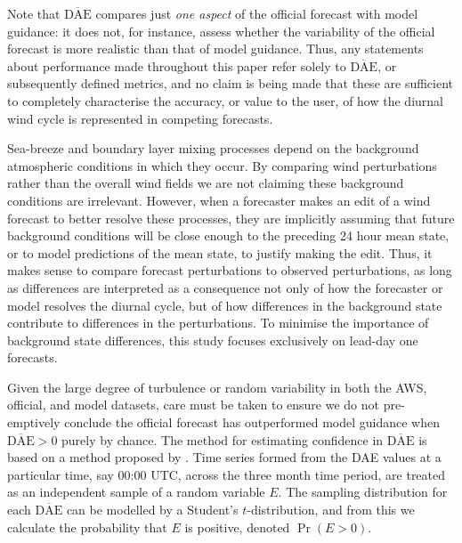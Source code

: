 \documentclass[twocol]{ametsoc}
\DeclareMathOperator{\pr}{Pr}
\begin{document}
Note that $\overline{\text{DAE}}$ compares just \textit{one aspect} of the official forecast with model guidance: it does not, for instance, assess whether the variability of the official forecast is more realistic than that of model guidance. Thus, any statements about performance made throughout this paper refer solely to $\overline{\text{DAE}}$, or subsequently defined metrics, and no claim is being made that these are sufficient to completely characterise the accuracy, or value to the user, of how the diurnal wind cycle is represented in competing forecasts.

Sea-breeze and boundary layer mixing processes depend on the background atmospheric conditions in which they occur. By comparing wind perturbations rather than the overall wind fields we are not claiming these background conditions are irrelevant. However, when a forecaster makes an edit of a wind forecast to better resolve these processes, they are implicitly assuming that future background conditions will be close enough to the preceding 24 hour mean state, or to model predictions of the mean state, to justify making the edit. Thus, it makes sense to compare forecast perturbations to observed perturbations, as long as differences are interpreted as a consequence not only of how the forecaster or model resolves the diurnal cycle, but of how differences in the background state contribute to differences in the perturbations. To minimise the importance of background state differences, this study focuses exclusively on lead-day one forecasts.

Given the large degree of turbulence or random variability in both the AWS, official, and model datasets, care must be taken to ensure we do not pre-emptively conclude the official forecast has outperformed model guidance when $\overline{\text{DAE}}>0$ purely by chance. The method for estimating confidence in $\overline{\text{DAE}}$ is based on a method proposed by \citet{griffiths17}. Time series formed from the DAE values at a particular time, say 00:00 UTC, across the three month time period, are treated as an independent sample of a random variable $E$. The sampling distribution for each $\overline{\text{DAE}}$ can be modelled by a Student's $t$-distribution, and from this we calculate the probability that $E$ is positive, denoted $\pr\left(E > 0\right)$. 
\end{document}
